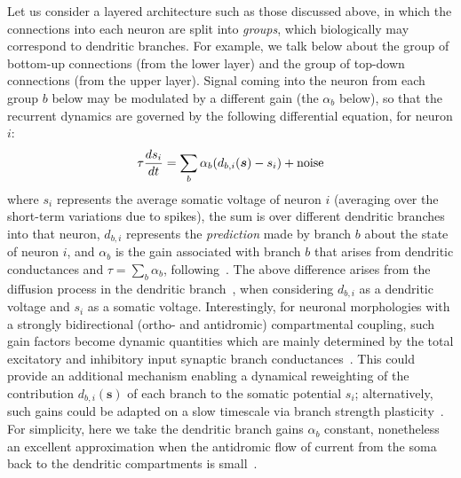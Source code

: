 \documentclass{article}
\newcommand   \vs{{\bm s}}
\begin{document}
Let us consider a layered architecture such as those discussed above,
in which the connections into each neuron are split into {\em groups},
which biologically may correspond to dendritic branches. For example,
we talk below about the group of bottom-up connections (from the lower layer)
and the group of top-down connections (from the upper layer).
Signal coming into the neuron from each group $b$ below may be modulated by
a different gain (the $\alpha_b$ below), so that
the recurrent dynamics are governed by the following differential
equation, for neuron $i$:
\begin{equation}
  \label{eq:multi-branch-update}
  \tau \frac{ds_i}{dt} = \sum_b \alpha_b (d_{b,i}(\vs) - s_i) + {\rm noise}
\end{equation}
where $s_i$ represents the average somatic voltage of neuron $i$ (averaging
over the short-term variations due to spikes),
the sum is over different dendritic branches into that neuron,
$d_{b,i}$ represents the {\em prediction} made by branch $b$ about the
state of neuron $i$, and $\alpha_b$ is the gain associated
with branch $b$ that arises from dendritic conductances
and $\tau = \sum_b \alpha_b$, following~\citet{Urbanczik+Senn-2014}.
The above difference arises from the diffusion process in the dendritic
branch~\citep{Koch2004}, when considering $d_{b,i}$ as a dendritic voltage and
$s_i$ as a somatic voltage. Interestingly, for neuronal morphologies with a
strongly bidirectional (ortho- and antidromic) compartmental coupling, such
gain factors become dynamic quantities which are mainly determined by the total
excitatory and inhibitory input synaptic branch
conductances~\citep{Sacramento2016}. This could provide an additional mechanism
enabling a dynamical reweighting of the contribution $d_{b,i}(\vs)$ of each
branch to the somatic potential $s_i$; alternatively, such gains could be
adapted on a slow timescale via branch strength plasticity~\citep{Losonczy2008}.
For simplicity, here we take the dendritic branch gains $\alpha_b$ constant,
nonetheless an excellent approximation when the antidromic flow of current from
the soma back to the dendritic compartments is
small~\citep{Urbanczik+Senn-2014}.
\end{document}
